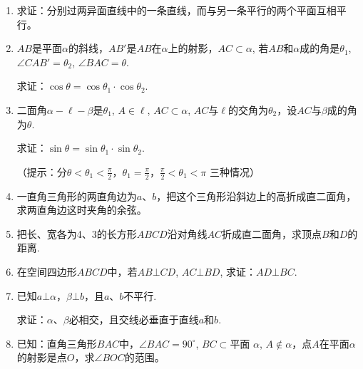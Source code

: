 \begin{enumerate}
\begin{enumerate}[(1)]
    \item $a\parallel b$，$a$、$c$是异面直线，则$b$、$c$是异面直线；\hfill (\quad )
    \item $a\bot b$, $a\bot c$, $b\subset \alpha$, $c\subset \alpha$，则$a\bot \alpha$；\hfill (\quad )
    \item 过点$A$而平行于平面$\alpha$的直线，必在过点$A$而平行于平面$\alpha$的平面内.\hfill (\quad )
\end{enumerate}
 \item  求证：分别过两异面直线中的一条直线，而与另一条平行的两个平面互相平行。
 \item $AB$是平面$\alpha$的斜线，$AB'$是$AB$在$\alpha$上的射影，$AC\subset \alpha$, 若$AB$和$\alpha$成的角是$\theta_1$, $\angle CAB'=\theta_2$, $\angle BAC=\theta$.
 
 求证：$\cos\theta=\cos\theta_1\cdot \cos\theta_2$.
 \item 二面角$\alpha-\ell-\beta$是$\theta_1$, $A\in\ell$, $AC\subset \alpha$, $AC$与$\ell$的交角为$\theta_2$，设$AC$与$\beta$成的角为$\theta$.
 
 求证：$\sin\theta=\sin\theta_1\cdot \sin\theta_2$.

 （提示：分$\theta<\theta_1<\frac{\pi}{2}$，$\theta_1=\frac{\pi}{2}$，$\frac{\pi}{2}<\theta_1<\pi$ 三种情况）
 \item 一直角三角形的两直角边为$a$、$b$，把这个三角形沿斜边上的高折成直二面角，求两直角边这时夹角的余弦。
 
 \item 把长、宽各为4、3的长方形$ABCD$沿对角线$AC$折成直二面角，求顶点$B$和$D$的距离.
 \item 在空间四边形$ABCD$中，若$AB\bot CD$, $AC\bot BD$,  求证：$AD\bot BC$.
 \item 已知$a\bot \alpha$，$\beta\bot b$，且$a$、$b$不平行.
 
 求证：$\alpha$、$\beta$必相交，且交线必垂直于直线$a$和$b$.
 \item 已知：直角三角形$BAC$中，$\angle BAC=90^{\circ}$, $BC\subset $平面
 $\alpha$, $A\notin\alpha$，点$A$在平面$\alpha$的射影是点$O$，求$\angle BOC$的范围。
 

 \noindent
 \begin{minipage}{.45\textwidth}
    \centering
\end{minipage}
\end{enumerate}
